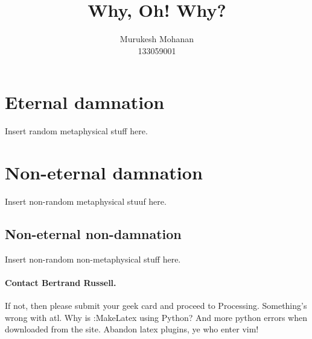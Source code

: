 \documentclass{article}
\title{Why, Oh! Why?}
\author{Murukesh Mohanan\\133059001}
\begin{document}
\maketitle
\tableofcontents
\newpage
\section{Eternal damnation}
Insert random metaphysical stuff here.
\section{Non-eternal damnation}
Insert non-random metaphysical stuuf here.
\subsection{Non-eternal non-damnation}
Insert non-random non-metaphysical stuff here.

\paragraph{Contact Bertrand Russell.}
If not, then please submit your geek card and proceed to Processing.
Something's wrong with atl. Why is :MakeLatex using Python?
And more python errors when downloaded from the site.
Abandon latex plugins, ye who enter vim!
\end{document}
